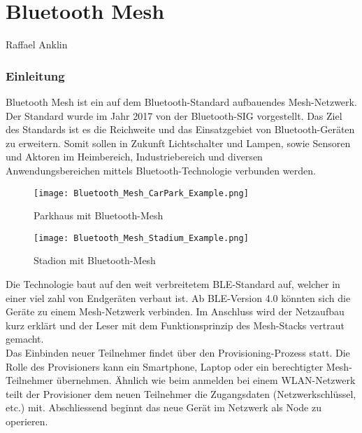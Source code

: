 \vspace*{4cm}
\part{Bluetooth Mesh}\label{part:BluetoothMesh}
Raffael Anklin
\vspace*{\fill}
\clearpage

\section{Einleitung}\label{sec:EinleitungBluetooth}


Bluetooth Mesh ist ein auf dem Bluetooth-Standard aufbauendes Mesh-Netzwerk. Der Standard wurde im Jahr 2017 von der Bluetooth-SIG vorgestellt. Das Ziel des Standards ist es die Reichweite und das Einsatzgebiet von Bluetooth-Geräten zu erweitern. Somit sollen in Zukunft Lichtschalter und Lampen, sowie Sensoren und Aktoren im Heimbereich, Industriebereich und diversen Anwendungsbereichen mittels Bluetooth-Technologie verbunden werden.  \\

\begin{figure}[!htbp]
	\begin{minipage}{0.49\textwidth}
		\centering
		\texttt{[image: Bluetooth\_Mesh\_CarPark\_Example.png]}
		\caption[Parkhaus mit Bluetooth-Mesh]{Parkhaus mit Bluetooth-Mesh \cite{bluetooth_sig_mesh-technology-overviewpdf_2020}}
		\label{fig:BluetoothMeshParkingExample}
	\end{minipage}
	\begin{minipage}{0.49\textwidth}
		\centering
		\texttt{[image: Bluetooth\_Mesh\_Stadium\_Example.png]}
		\caption[Stadion mit Bluetooth-Mesh]{Stadion mit Bluetooth-Mesh \cite{bluetooth_sig_mesh-technology-overviewpdf_2020}}
		\label{fig:BluetoothMeshStadiumExample}
	\end{minipage}
\end{figure}


Die Technologie baut auf den weit verbreitetem BLE-Standard auf, welcher in einer viel zahl von Endgeräten verbaut ist. Ab BLE-Version 4.0 könnten sich die Geräte zu einem Mesh-Netzwerk verbinden. Im Anschluss wird der Netzaufbau kurz erklärt und der Leser mit dem Funktionsprinzip des Mesh-Stacks vertraut gemacht.\\

Das Einbinden neuer Teilnehmer findet über den Provisioning-Prozess statt. Die Rolle des Provisioners kann ein Smartphone, Laptop oder ein berechtigter Mesh-Teilnehmer übernehmen. Ähnlich wie beim anmelden bei einem WLAN-Netzwerk teilt der Provisioner dem neuen Teilnehmer die Zugangsdaten (Netzwerkschlüssel, etc.) mit. Abschliessend beginnt das neue Gerät im Netzwerk als Node zu operieren. \\  


